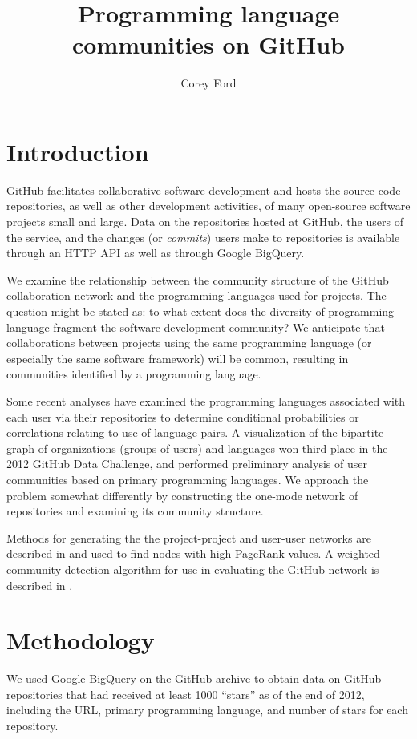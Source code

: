 \documentclass[twocolumn]{article}
\title{Programming language communities on GitHub}
\author{Corey Ford}
\begin{document}
\maketitle

\section{Introduction}

GitHub \cite{github} facilitates collaborative software development and hosts
the source code repositories, as well as other development activities, of many
open-source software projects small and large. Data on the repositories hosted
at GitHub, the users of the service, and the changes (or \textit{commits}) users
make to repositories is available through an HTTP API as well as through Google
BigQuery.

We examine the relationship between the community structure of the GitHub
collaboration network and the programming languages used for projects. The
question might be stated as: to what extent does the diversity of programming
language fragment the software development community? We anticipate that
collaborations between projects using the same programming language (or
especially the same software framework) will be common, resulting in communities
identified by a programming language.

Some recent analyses have examined the programming languages associated with
each user via their repositories to determine conditional probabilities
\cite{doll12} or correlations \cite{shah13} relating to use of language pairs. A
visualization of the bipartite graph of organizations (groups of users) and
languages \cite{rodrigues12} won third place in the 2012 GitHub Data Challenge,
and \cite{weber12} performed preliminary analysis of user communities based on
primary programming languages. We approach the problem somewhat differently by
constructing the one-mode network of repositories and examining its community
structure.

Methods for generating the the project-project and user-user networks are
described in \cite{thung2013} and used to find nodes with high PageRank values.
A weighted community detection algorithm for use in evaluating the GitHub
network is described in \cite{marrama}.

\section{Methodology}
We used Google BigQuery on the GitHub archive to obtain data on GitHub
repositories that had received at least 1000 ``stars'' as of the end of 2012,
including the URL, primary programming language, and number of stars for each
repository.
\end{document}
